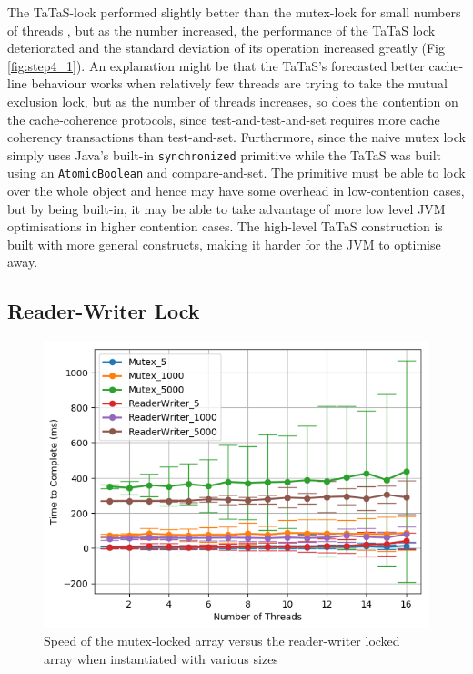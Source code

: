 \documentclass[11pt]{article}
\begin{document}
The TaTaS-lock performed slightly better than the mutex-lock for small numbers of threads , but as the number increased, the performance of the TaTaS lock deteriorated and the standard deviation of its operation increased greatly (Fig \ref{fig:step4_1}). An explanation might be that the TaTaS's forecasted better cache-line behaviour works when relatively few threads are trying to take the mutual exclusion lock, but as the number of threads increases, so does the contention on the cache-coherence protocols, since test-and-test-and-set requires more cache coherency transactions than test-and-set. Furthermore, since the naive mutex lock simply uses Java's built-in \texttt{synchronized} primitive while the TaTaS was built using an \texttt{AtomicBoolean} and compare-and-set. The primitive must be able to lock over the whole object and hence may have some overhead in low-contention cases, but by being built-in, it may be able to take advantage of more low level JVM optimisations in higher contention cases. The high-level TaTaS construction is built with more general constructs, making it harder for the JVM to optimise away.

\subsection{Reader-Writer Lock}
\begin{figure}
\centering
\includegraphics[scale=0.65]{step5_1.png}
\caption{Speed of the mutex-locked array versus the reader-writer locked array when instantiated with various sizes}
\label{fig:step5_1}
\end{figure}
\end{document}
